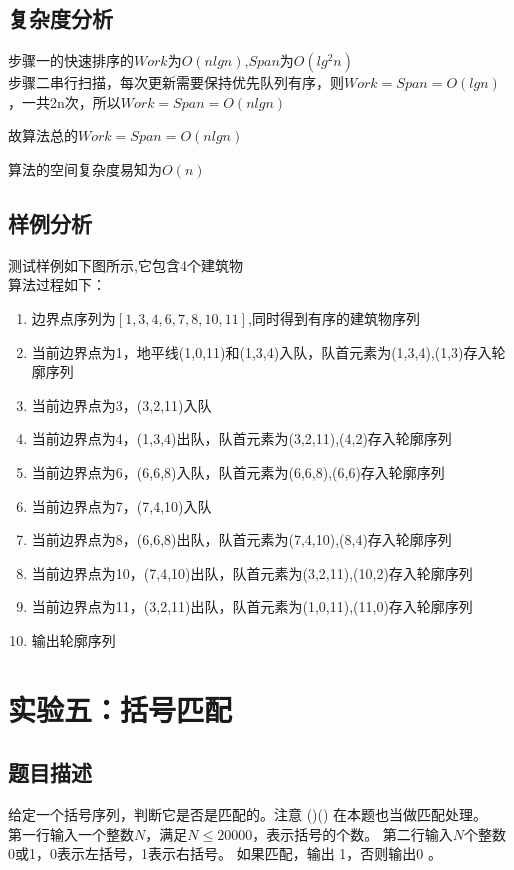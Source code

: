 \documentclass[UTF8,a4paperdui, %
]{ctexart}
\begin{document}
\subsection{复杂度分析}
步骤一的快速排序的$Work$为$O(nlgn)$,$Span$为$O(lg^2n)$\\
步骤二串行扫描，每次更新需要保持优先队列有序，则$Work=Span=O(lgn)$，一共2n次，所以$Work=Span=O(nlgn)$\par
故算法总的$Work=Span=O(nlgn)$\par
算法的空间复杂度易知为$O(n)$

\subsection{样例分析}
测试样例如下图所示,它包含4个建筑物
\\
算法过程如下：
\begin{enumerate}
    \item 边界点序列为$[1,3,4,6,7,8,10,11]$,同时得到有序的建筑物序列
    \item 当前边界点为1，地平线(1,0,11)和(1,3,4)入队，队首元素为(1,3,4),(1,3)存入轮廓序列
    \item 当前边界点为3，(3,2,11)入队
    \item 当前边界点为4，(1,3,4)出队，队首元素为(3,2,11),(4,2)存入轮廓序列
    \item 当前边界点为6，(6,6,8)入队，队首元素为(6,6,8),(6,6)存入轮廓序列
    \item 当前边界点为7，(7,4,10)入队
    \item 当前边界点为8，(6,6,8)出队，队首元素为(7,4,10),(8,4)存入轮廓序列
    \item 当前边界点为10，(7,4,10)出队，队首元素为(3,2,11),(10,2)存入轮廓序列
    \item 当前边界点为11，(3,2,11)出队，队首元素为(1,0,11),(11,0)存入轮廓序列
    \item 输出轮廓序列
\end{enumerate}

\newpage
\section{实验五：括号匹配}

\subsection{题目描述}
给定一个括号序列，判断它是否是匹配的。注意 ()() 在本题也当做匹配处理。\\
第一行输入一个整数$N$，满足$N\leq20000$，表示括号的个数。
第二行输入$N$个整数0或1，0表示左括号，1表示右括号。
如果匹配，输出 1，否则输出0 。
\end{document}
